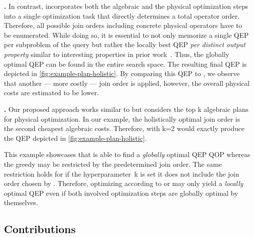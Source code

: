 \textbf{\holistic.}
In contrast, \holistic incorporates both the algebraic and the physical optimization steps into a single optimization task that directly determines a total operator order.  Therefore, all possible join orders including concrete physical operators have to be enumerated.  While doing so, it is essential to not only memorize a single QEP per subproblem of the query but rather the locally best QEP \emph{per distinct output property} similar to interesting properties in prior work~\cite{access_path_selection}.  Thus, the globally optimal QEP can be found in the entire search space.  The resulting final QEP is depicted in \autoref{fig:example-plan-holistic}.  By comparing this QEP to \split, we observe that another --- more costly \wrt \Cout --- join order is applied, however, the overall physical costs are estimated to be lower.

\textbf{\topk.}
Our proposed approach \topk works similar to \split but considers the top k algebraic plans for physical optimization.  In our example, the holistically optimal join order is the second cheapest \wrt algebraic costs.  Therefore, \topk with k=2 would exactly produce the QEP depicted in \autoref{fig:example-plan-holistic}.

This example showcases that \holistic is able to find a \emph{globally} optimal QEP \wrt QOP whereas the greedy \split may be restricted by the predetermined join order.  The same restriction holds for \topk if the hyperparameter~k is set \sut it does not include the join order chosen by \holistic.  Therefore, optimizing according to \split or \topk may only yield a \emph{locally} optimal QEP even if both involved optimization steps are globally optimal by themselves.

\subsection{Contributions}

